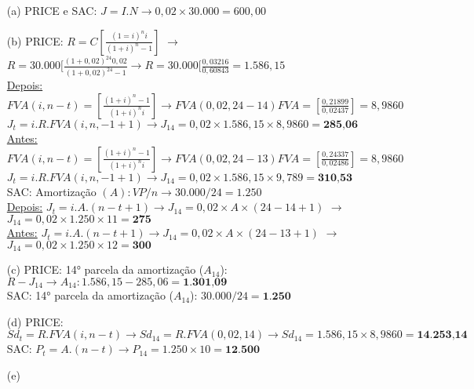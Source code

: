 \documentclass[report]{uftex}
\begin{document}
\begin{itemize}
	\item[(a)] PRICE e SAC:
	 $J = I . N \rightarrow 0,02 \times 30.000 = 600,00$
	
	\item[(b)] PRICE:
	$R = C[\frac{(1=i)^ni}{(1+i)^n-1}]$ $\rightarrow$ $R = 30.000[\frac{(1+0,02)^{24}0,02}{(1+0,02)^{24}-1} \rightarrow R = 30.000[\frac{0,03216}{0,60843} = 1.586,15$ \\
	\underline{Depois:} $FVA(i,n-t) = [\frac{(1+i)^n-1}{(1+i)^ni}] \rightarrow FVA(0,02, 24-14) FVA = [\frac{0,21899}{0,02437}] = 8,9860$ \\
	 $J_{t} = i . R . FVA (i,n,-1+1) \rightarrow J_{14} = 0,02 \times 1.586,15 \times 8,9860 = \textbf{285,06}$\\
	\underline{Antes:}  $FVA(i,n-t) = [\frac{(1+i)^n-1}{(1+i)^ni}] \rightarrow FVA(0,02, 24-13) FVA = [\frac{0,24337}{0,02486}] = 8,9860$ \\
	$J_{t} = i . R . FVA (i,n,-1+1) \rightarrow J_{14} = 0,02 \times 1.586,15 \times 9,789 = \textbf{310,53}$\\
	
	SAC: 
	Amortização $(A): VP/n \rightarrow 30.000/24 = 1.250$ \\
	\underline{Depois:}
	$J_t = i.A.(n-t+1) \rightarrow J_{14} = 0,02 \times A \times (24-14+1)$ $\rightarrow$ $J_{14} = 0,02 \times 1.250 \times 11 = \textbf{275}$\\
	\underline{Antes:}
	$J_t = i.A.(n-t+1) \rightarrow J_{14} = 0,02 \times A \times (24-13+1)$ $\rightarrow$ $J_{14} = 0,02 \times 1.250 \times 12 = \textbf{300}$ \\

	\item[(c)] PRICE:
	14° parcela da amortização ($A_{14}$): $R - J_{14} \rightarrow A_{14}: 1.586,15 - 285,06 = \textbf{1.301,09}$\\
	SAC: 
	14° parcela da amortização ($A_{14}$): $30.000/24 = \textbf{1.250}$
	 
	\item[(d)] PRICE:
	$Sd_{t} = R.FVA(i,n-t) \rightarrow Sd_{14} = R.FVA(0,02,14) \rightarrow Sd_{14} = 1.586,15 \times 8,9860 = \textbf{14.253,14}$\\
	SAC: 
	$P_{t} = A.(n-t) \rightarrow P_{14} = 1.250 \times 10 = \textbf{12.500}$
	
	\item[(e)]
	
\end{itemize}
\end{document}
